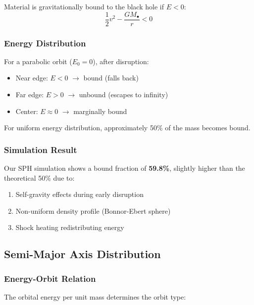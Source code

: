 \documentclass[twocolumn,amsmath,amssymb,prd,superscriptaddress,nofootinbib]{revtex4-2}
\begin{document}
Material is gravitationally bound to the black hole if $E < 0$:
\begin{equation}
    \frac{1}{2}v^2 - \frac{GM_\bullet}{r} < 0
\end{equation}

\subsubsection{Energy Distribution}

For a parabolic orbit ($E_0 = 0$), after disruption:
\begin{itemize}
    \item Near edge: $E < 0$ $\rightarrow$ bound (falls back)
    \item Far edge: $E > 0$ $\rightarrow$ unbound (escapes to infinity)
    \item Center: $E \approx 0$ $\rightarrow$ marginally bound
\end{itemize}

For uniform energy distribution, approximately 50\% of the mass becomes bound.

\subsubsection{Simulation Result}

Our SPH simulation shows a bound fraction of \textbf{59.8\%}, slightly higher than the theoretical 50\% due to:
\begin{enumerate}
    \item Self-gravity effects during early disruption
    \item Non-uniform density profile (Bonnor-Ebert sphere)
    \item Shock heating redistributing energy
\end{enumerate}

\subsection{Semi-Major Axis Distribution}
\label{sec:sma}

\subsubsection{Energy-Orbit Relation}

The orbital energy per unit mass determines the orbit type:
\end{document}
